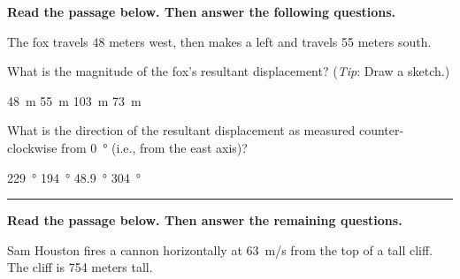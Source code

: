 \documentclass[../main-physics-workbook.tex]{subfiles}
\begin{document}
\begin{questions}
\clearpage
\begin{EnvUplevel}
\textbf{Read the passage below. Then answer the following questions.}

The fox travels 48 meters west, then makes a left and travels 55 meters south.
\end{EnvUplevel}

\question
 What is the magnitude of the fox's resultant displacement? (\textit{Tip}: Draw a sketch.)

\begin{choices}
    \choice \SI{48}{m}
    \choice \SI{55}{m}
    \choice \SI{103}{m}
    \correctchoice \SI{73}{m}
\end{choices}

\question
What is the direction of the resultant displacement as measured counter-clockwise from \SI{0}{\degree} (i.e., from the east axis)?

\begin{choices}
    \correctchoice \SI{229}{\degree}
    \choice \SI{194}{\degree}
    \choice \SI{48.9}{\degree}
    \choice \SI{304}{\degree}
\end{choices}
\vspace{1em}
\hrule

\begin{EnvUplevel}
    \textbf{Read the passage below. Then answer the remaining questions.}
    
    Sam Houston fires a cannon horizontally at \SI{63}{m/s} from the top of a tall cliff. The cliff is 754 meters tall.
\end{EnvUplevel}

\begin{figure}[h!]
    \centering
\end{figure}


\end{questions}
\end{document}
